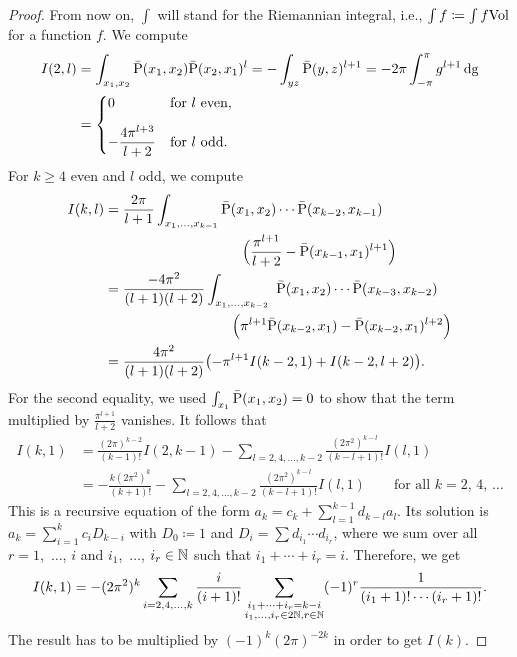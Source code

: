 \documentclass[\MainFolder/Text.tex]{subfiles}
\begin{document}
\begin{proof}
From now on, $\int$ will stand for the Riemannian integral, i.e., $\int f \coloneqq \int f\mathrm{Vol}$ for a function $f$. We compute
%
\allowdisplaybreaks
\begin{align*}
I(2,l) &= \int_{x_1, x_2} \bar{\mathrm{P}}(x_1,x_2)\bar{\mathrm{P}}(x_2,x_1)^{l} = - \int_{y z} \bar{\mathrm{P}}(y,z)^{l+1} =- 2\pi \int_{-\pi}^\pi g^{l+1} \operatorname{dg} \\ &= \begin{cases} 0 & \text{for }l \text{ even}, \\[2ex] 
 - \dfrac{4 \pi^{l+3}}{l+2} &\text{for }l\text{ odd}. \end{cases}
\end{align*}
For $k\ge 4$ even and $l$ odd, we compute %
\allowdisplaybreaks
\begin{align*}
 I(k,l) &= \begin{multlined}[t]\frac{2\pi}{l+1}\int_{x_1, \dotsc, x_{k-1}}\bar{\Prpg}(x_1,x_2)\dotsm \bar{\Prpg}(x_{k-2},x_{k-1}) \\ \Bigl(\frac{\pi^{l+1}}{l+2} - \bar{\Prpg}(x_{k-1},x_1)^{l+1}\Bigr) \end{multlined} \\ 
&\begin{multlined}
=\frac{-4\pi^2}{(l+1)(l+2)} \int_{x_1, \dotsc, x_{k-2}}\ \bar{\Prpg}(x_1,x_2) \dotsm \bar{\Prpg}(x_{k-3},x_{k-2})\\ \Bigl(\pi^{l+1} \bar{\Prpg}(x_{k-2},x_1)
 -\bar{\Prpg}(x_{k-2},x_1)^{l+2}\Bigr)
\end{multlined} \\
&= \frac{4\pi^2}{(l+1)(l+2)}\bigl(-\pi^{l+1} I(k-2,1)+I(k-2,l+2)\bigr).
\end{align*}
%
For the second equality, we used $\int_{x_1} \bar{\mathrm{P}}(x_1,x_2) = 0$ to show that the term multiplied by $\frac{\pi^{l+1}}{l+2}$ vanishes. It follows that
\allowdisplaybreaks
\begin{align*}
I(k,1) &= \frac{(2\pi)^{k-2}}{(k-1)!} I(2,k-1) - \sum_{l=2, 4, \dotsc, k-2} \frac{(2\pi^2)^{k-l}}{(k-l+1)!} I(l,1) \\ 
&=-\frac{k(2\pi^2)^k}{(k+1)!}-\sum_{l=2, 4, \dotsc, k-2} \frac{(2\pi^2)^{k-l}}{(k-l+1)!} I(l,1)\qquad\text{for all }k=2,\,4,\,\dotsc
\end{align*}
This is a recursive equation of the form $a_k = c_k + \sum_{l=1}^{k-1} d_{k-l} a_l$. Its solution is $a_k = \sum_{i=1}^k c_i D_{k-i}$ with $D_0\coloneqq 1$ and $D_i = \sum d_{i_1} \dotsm d_{i_r}$, where we sum over all $r=1$,~$\dotsc$, $i$ and $i_1$,~$\dotsc$, $i_r\in \mathbb{N}$ such that $i_1+ \dotsb + i_r = i$. Therefore, we get %
$$ I(k,1) = -(2\pi^2)^k \sum_{i=2, 4, \dotsc, k} \frac{i}{(i+1)!} \sum_{\substack{i_1 + \dotsb + i_r = k-i \\ i_1, \dotsc, i_r \in 2\mathbb{N}, r\in \mathbb{N}}} (-1)^r \frac{1}{(i_1+1)! \dotsm (i_r+1)!}.$$
The result has to be multiplied by $(-1)^k(2\pi)^{-2k}$ in order to get $I(k)$. 
\end{proof} %
\end{document}
